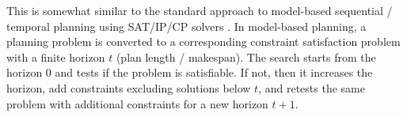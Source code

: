 This is somewhat similar to the standard approach to model-based sequential / temporal planning using SAT/IP/CP solvers \cite{kautz1992planning,van2005optiplan}.
In model-based planning, a planning problem is converted to a corresponding constraint satisfaction problem with a finite horizon $t$ (plan length / makespan). The search starts from the horizon 0 and tests if the problem is satisfiable. If not, then it increases the horizon, add constraints excluding solutions below $t$, and retests the same problem with additional constraints for a new horizon $t+1$.







